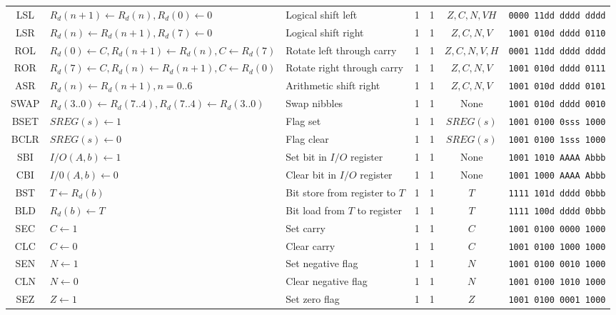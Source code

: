 \documentclass[11pt]{article}
\begin{document}
\begin{center}
\begin{longtable}{|c|m{10em}|l|c|c|c|c|}
\hline\hline
 \rowcolor{gray!10}
\multicolumn{7}{|c|}{Opérations bit à bit} \\
\hline
LSL & $R_d(n+1) \leftarrow R_d(n), R_d(0) \leftarrow 0$ & Logical shift left & 1 & 1 & $Z, C, N, V H$ & \texttt{0000 11dd dddd dddd}\\
LSR & $R_d(n) \leftarrow R_d(n+1), R_d(7) \leftarrow 0$ & Logical shift right & 1 & 1 & $Z, C, N, V$ & \texttt{1001 010d dddd 0110}\\
ROL & $R_d(0) \leftarrow C, R_d(n+1) \leftarrow R_d(n), C \leftarrow R_d(7)$ & Rotate left through carry & 1 & 1 & $Z, C, N, V, H$ & \texttt{0001 11dd dddd dddd}\\
ROR & $R_d(7) \leftarrow C, R_d(n) \leftarrow R_d(n+1), C \leftarrow R_d(0)$ & Rotate right through carry & 1 & 1 & $Z, C, N, V$ & \texttt{1001 010d dddd 0111}\\
ASR & $R_d(n) \leftarrow R_d(n+1), n=0..6$ & Arithmetic shift right & 1 & 1 & $Z, C, N, V$ & \texttt{1001 010d dddd 0101}\\
SWAP & $R_d(3..0) \leftarrow R_d(7..4), R_d(7..4) \leftarrow R_d(3..0)$ & Swap nibbles & 1 & 1 & None & \texttt{1001 010d dddd 0010}\\
BSET & $SREG(s) \leftarrow 1$ & Flag set & 1 & 1 & $SREG(s)$ & \texttt{1001 0100 0sss 1000}\\
BCLR & $SREG(s) \leftarrow 0$ & Flag clear & 1 & 1 & $SREG(s)$ & \texttt{1001 0100 1sss 1000}\\
SBI & $I/O(A, b) \leftarrow 1$ & Set bit in $I/O$ register & 1 & 1 & None & \texttt{1001 1010 AAAA Abbb}\\
CBI & $I/0(A, b) \leftarrow 0$ & Clear bit in $I/O$ register & 1 & 1 & None & \texttt{1001 1000 AAAA Abbb}\\
BST & $T \leftarrow R_d(b)$ & Bit store from register to $T$ & 1 & 1 & $T$ & \texttt{1111 101d dddd 0bbb}\\
BLD & $R_d(b) \leftarrow T$ & Bit load from $T$ to register & 1 & 1 & $T$ & \texttt{1111 100d dddd 0bbb}\\
SEC & $C \leftarrow 1$ & Set carry & 1 & 1 & $C$ & \texttt{1001 0100 0000 1000}\\
CLC & $C \leftarrow 0$ & Clear carry & 1 & 1 & $C$ & \texttt{1001 0100 1000 1000}\\
SEN & $N \leftarrow 1$ & Set negative flag & 1 & 1 & $N$ & \texttt{1001 0100 0010 1000}\\
CLN & $N \leftarrow 0$ & Clear negative flag & 1 & 1 & $N$ & \texttt{1001 0100 1010 1000}\\
SEZ & $Z \leftarrow 1$ & Set zero flag & 1 & 1 & $Z$ & \texttt{1001 0100 0001 1000}\\

\end{longtable}
\end{center}
\end{document}
